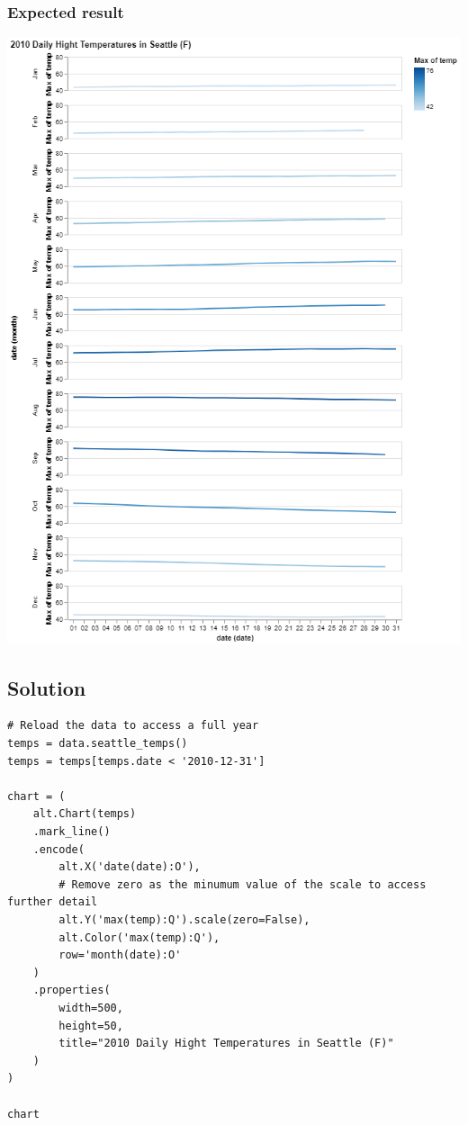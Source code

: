 \documentclass[11pt]{article}
\begin{document}
\subsubsection*{Expected result}

\begin{center}
\includegraphics[width=.7\textwidth]{visualization (7).png}
\end{center}

\subsection*{Solution}

\begin{verbatim}
# Reload the data to access a full year
temps = data.seattle_temps()
temps = temps[temps.date < '2010-12-31']

chart = (
    alt.Chart(temps)
    .mark_line()
    .encode(
        alt.X('date(date):O'),
        # Remove zero as the minumum value of the scale to access further detail
        alt.Y('max(temp):Q').scale(zero=False),
        alt.Color('max(temp):Q'),
        row='month(date):O'
    )
    .properties(
        width=500,
        height=50,
        title="2010 Daily Hight Temperatures in Seattle (F)"
    )
)

chart
\end{verbatim}
\end{document}
